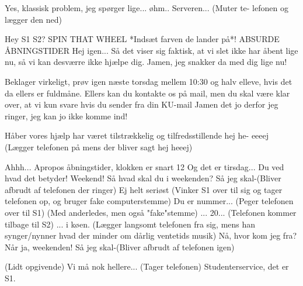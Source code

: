\documentclass[a4paper,11pt]{article}
\begin{document}
\begin{sketch}
 Yes, klassisk problem, jeg spørger lige... øhm.. Serveren... (Muter te-
lefonen og lægger den ned)

 Hey S1
 S2?
 SPIN THAT WHEEL
 *Indsæt farven de lander på*!
 ABSURDE ÅBNINGSTIDER
 Hej igen... Så det viser sig faktisk, at vi slet ikke har åbent lige nu, så
vi kan desværre ikke hjælpe dig.
 Jamen, jeg snakker da med dig lige nu!

 Beklager virkeligt, prøv igen næste torsdag mellem 10:30 og halv elleve, hvis det da ellers er fuldmåne. Ellers kan du kontakte os på mail, men du skal være klar over, at vi kun svare hvis du sender fra din
KU-mail
 Jamen det jo derfor jeg ringer, jeg kan jo ikke komme ind!

 Håber vores hjælp har været tilstrækkelig og tilfredsstillende hej he-
eeeej (Lægger telefonen på mens der bliver sagt hej heeej)

 Ahhh...
 Apropos åbningstider, klokken er snart 12
 Og det er tirsdag... Du ved hvad det betyder!
 Weekend!
 Så hvad skal du i weekenden?
 Så jeg skal-(Bliver afbrudt af telefonen der ringer)
 Ej helt seriøst (Vinker S1 over til sig og tager telefonen op, og bruger
fake computerstemme) Du er nummer... (Peger telefonen over til S1)
 (Med anderledes, men også "fake"stemme) ... 20... (Telefonen kommer
tilbage til S2)
 ... i køen. (Lægger langsomt telefonen fra sig, mens han synger/nynner
hvad der minder om dårlig ventetids musik)
 Nå, hvor kom jeg fra? Når ja, weekenden! Så jeg skal-(Bliver afbrudt
af telefonen igen)

 (Lidt opgivende) Vi må nok hellere... (Tager telefonen) Studenterservice, det er S1.


\end{sketch}
\end{document}
